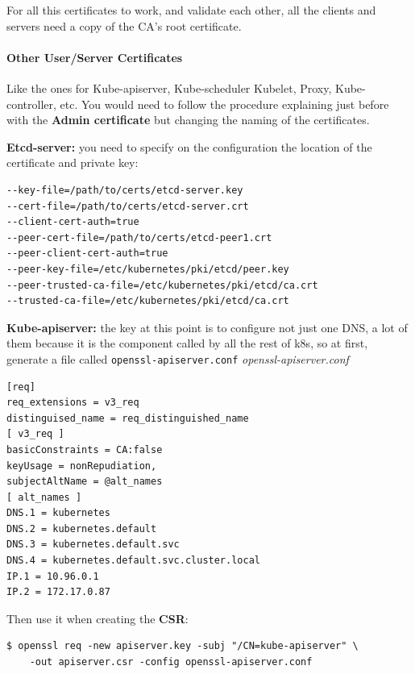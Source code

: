 \documentclass{article}
\newenvironment{blocktemplateIII}[1]{%
    \tcolorbox[beamer,%
    noparskip,breakable,
    ,colframe=Red,%
    colbacklower=LimeGreen!75!LightGreen,%
    title=#1]}%
    {\endtcolorbox}
\newenvironment{codetemplate}[1][]{%
  \mybasecolorbox[#1]
  \itshape
}{%
  \endmybasecolorbox
}
\begin{document}
\begin{blocktemplateIII}{WARNING}
For all this certificates to work, and validate each other, all the clients and servers need a copy of the CA's root certificate.
\end{blocktemplateIII}

\paragraph{Other User/Server Certificates}
Like the ones for Kube-apiserver, Kube-scheduler Kubelet, Proxy, Kube-controller, etc. You would need to follow the procedure explaining just before with the \textbf{Admin certificate} but changing the naming of the certificates.

\textbf{Etcd-server:} you need to specify on the configuration the location of the certificate and private key:
\begin{codetemplate}{}
\begin{verbatim}
--key-file=/path/to/certs/etcd-server.key
--cert-file=/path/to/certs/etcd-server.crt
--client-cert-auth=true
--peer-cert-file=/path/to/certs/etcd-peer1.crt
--peer-client-cert-auth=true
--peer-key-file=/etc/kubernetes/pki/etcd/peer.key
--peer-trusted-ca-file=/etc/kubernetes/pki/etcd/ca.crt
--trusted-ca-file=/etc/kubernetes/pki/etcd/ca.crt
\end{verbatim}
\end{codetemplate}

\textbf{Kube-apiserver:} the key at this point is to configure not just one DNS, a lot of them because it is the component called by all the rest of k8s, so at first, generate a file called \verb|openssl-apiserver.conf|
\begin{codetemplate}{openssl-apiserver.conf}
\begin{verbatim}
[req]
req_extensions = v3_req
distinguised_name = req_distinguished_name
[ v3_req ]
basicConstraints = CA:false
keyUsage = nonRepudiation,
subjectAltName = @alt_names
[ alt_names ]
DNS.1 = kubernetes
DNS.2 = kubernetes.default
DNS.3 = kubernetes.default.svc
DNS.4 = kubernetes.default.svc.cluster.local
IP.1 = 10.96.0.1
IP.2 = 172.17.0.87
\end{verbatim}
\end{codetemplate}

Then use it when creating the \textbf{CSR}:
\begin{codetemplate}{}
\begin{verbatim}
$ openssl req -new apiserver.key -subj "/CN=kube-apiserver" \
    -out apiserver.csr -config openssl-apiserver.conf
\end{verbatim}
\end{codetemplate}
\end{document}
